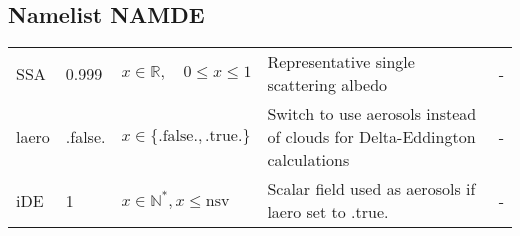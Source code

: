 \documentclass[twoside,11pt,fleqn,a4paper,english,openright]{report}
\begin{document}
\subsection{Namelist NAMDE}\label{par:deltaeddington}

\begin{center}
  \tablelasttail{
        &&&&\\\hline
  }
\begin{supertabular}{|l|p{2cm}|p{4cm}|p{6cm}|l|}
  SSA		& 0.999	& $x \in \mathbb{R}, \quad 0 \leq x \leq 1$	& Representative single scattering albedo & - \\
  \hypertarget{laero}{laero}	& .false.	& $x\in\{\text{.false.},\text{.true.}\}$	& Switch to use aerosols instead of clouds for Delta-Eddington calculations	& -\\
  iDE		& 1		& $x \in \mathbb{N}^*, x \leq \text{nsv}$	& Scalar field used as aerosols if laero set to .true. & - \\
\end{supertabular}
\end{center}
\end{document}
